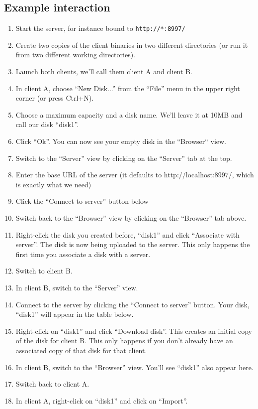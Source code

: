 \documentclass[a4paper,12pt]{article}
\begin{document}
\subsection{Example interaction}
\begin{enumerate}
\item Start the server, for instance bound to \lstinline[language=bash]!http://*:8997/!
\item Create two copies of the client binaries in two different directories (or run it from two different working directories).
\item Launch both clients, we'll call them client A and client B.
\item In client A, choose ``New Disk...'' from the ``File'' menu in the upper right corner (or press Ctrl+N).
\item Choose a maximum capacity and a disk name. We'll leave it at 10MB and call our disk ``disk1''.
\item Click ``Ok''. You can now see your empty disk in the ``Browser`` view.
\item Switch to the ``Server'' view by clicking on the ``Server'' tab at the top.
\item Enter the base URL of the server (it defaults to http://localhost:8997/, which is exactly what we need)
\item Click the ``Connect to server'' button below
\item Switch back to the ``Browser'' view by clicking on the ``Browser'' tab above.
\item Right-click the disk you created before, ``disk1'' and click ``Associate with server''. The disk is now being uploaded to the server. This only happens the first time you associate a disk with a server.
\item Switch to client B.
\item In client B, switch to the ``Server'' view.
\item Connect to the server by clicking the ``Connect to server'' button. Your disk, ``disk1'' will appear in the table below.
\item Right-click on ``disk1'' and click ``Download disk''. This creates an initial copy of the disk for client B. This only happens if you don't already have an associated copy of that disk for that client. 
\item In client B, switch to the ``Browser'' view. You'll see ``disk1'' also appear here.
\item Switch back to client A.
\item In client A, right-click on ``disk1'' and click on ``Import''.

\end{enumerate}
\end{document}
